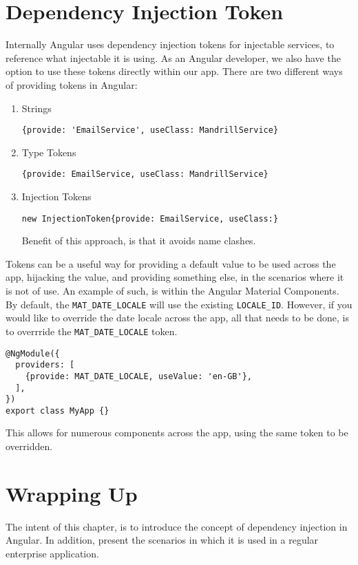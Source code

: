 \section{ Dependency Injection Token }
Internally Angular uses dependency injection tokens for injectable services, to
reference what injectable it is using. As an Angular developer, we also have the 
option to use these tokens directly within our app. There are two different 
ways of providing tokens in Angular:
\begin{enumerate}
  \item Strings 
\begin{lstlisting}  
{provide: 'EmailService', useClass: MandrillService}
\end{lstlisting}  
  \item Type Tokens
\begin{lstlisting}    
{provide: EmailService, useClass: MandrillService}
\end{lstlisting}  
  \item Injection Tokens
\begin{lstlisting}   
new InjectionToken{provide: EmailService, useClass:} 
\end{lstlisting}   
Benefit of this approach, is that it avoids name clashes.
\end{enumerate}

Tokens can be a useful way for providing a default value to be used across the 
app, hijacking the value, and providing something else, in the 
scenarios where it is not of use. An example of such, is within the Angular 
Material Components. By default, the \lstinline{MAT_DATE_LOCALE} will use 
the existing \lstinline{LOCALE_ID}. However, if you would like to override the 
date locale across the app, all that needs to be done, is to overrride the 
\lstinline{MAT_DATE_LOCALE} token. 
\begin{lstlisting}
@NgModule({
  providers: [
    {provide: MAT_DATE_LOCALE, useValue: 'en-GB'},
  ],
})
export class MyApp {}
\end{lstlisting}

This allows for numerous components across the app, using the same token to 
be overridden. 

\section{Wrapping Up}
The intent of this chapter, is to introduce the concept of dependency injection 
in Angular. In addition, present the scenarios in which it is used in a regular 
enterprise application. 
